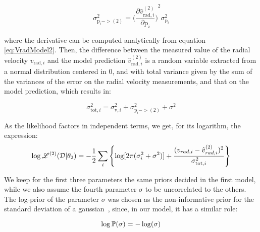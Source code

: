 \begin{equation}\label{eq:ParallaxErrorPropagation}
    \sigma^2_{\text{p}_i -> (2)} = {\biggl( \frac{\partial \hat{v}^{(2)}_{\text{rad}, i}}{\partial \text{p}_i} \biggr)}^2 \sigma^2_{\text{p}_i}
\end{equation}

\noindent
where the derivative can be computed analytically from equation \ref{eq:VradModel2}.
Then, the difference between the measured value of the radial velocity $v_{\text{rad}, i}$ and the model prediction $\hat{v}^{(2)}_{\text{rad}, i}$ is a random variable extracted from a normal distribution centered in 0, and with total variance given by the sum of the variances of the error on the radial velocity measurements, and that on the model prediction, which results in:

\begin{equation}\label{eq:ErrorPropagation}
    \sigma^2_{\text{tot}, i} = \sigma^2_{\text{v},i} + \sigma^2_{\text{p}_i -> (2)} + \sigma^2
\end{equation}

\noindent
As the likelihood factors in independent terms, we get, for its logarithm, the expression:
\begin{equation}\label{Eq:LogLikeMod2}
    \log \mathbb{\mathscr{L}}^{(2)}(\mathcal{D} \vert \theta_2) = -\frac{1}{2}\sum_i\left\{\log[2\pi(\sigma_{i}^2+\sigma^2)]+\frac{(v_{rad,i} - \hat{v}_{rad,i}^{(2)})^2}{\sigma_{\text{tot}, i}^2}\right\}
\end{equation}


We keep for the first three parameters the same priors decided in the first model, while we also assume the fourth parameter $\sigma$ to be uncorrelated to the others. %
The log-prior of the parameter $\sigma$ was chosen as the non-informative prior for the standard deviation of a gaussian~\cite{mackay2003}, since, in our model, it has a similar role:

\begin{equation}\label{eq:LogPriorSigma}
    \log \mathbb{P} (\sigma) = - \log(\sigma)
\end{equation}

